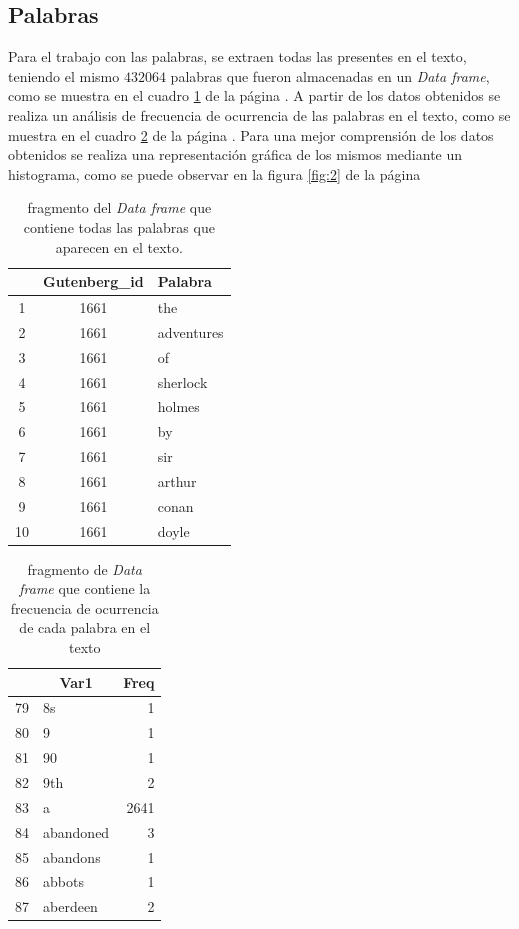 \documentclass{article}
\begin{document}
 \subsection{Palabras}
 Para el trabajo con las palabras, se extraen todas las presentes en el texto, teniendo el mismo $432064$ palabras que fueron almacenadas en un \textit{Data frame}, como se muestra en el cuadro \ref{tab:3} de la página \pageref{tab:3}. A partir de los datos obtenidos se realiza un análisis de frecuencia de ocurrencia de las palabras en el texto, como se muestra en el cuadro \ref{tab:4} de la página \pageref{tab:4}. Para una mejor comprensión de los datos obtenidos se realiza una representación gráfica de los mismos mediante un histograma, como se puede observar en la figura  \ref{fig:2} de la página \pageref{fig:2}
 
\begin{table}
  \centering
  \caption{fragmento del \textit{Data frame} que contiene todas las palabras que aparecen en el texto.}
    \begin{tabular}{ccl}
    \toprule
          & \textbf{Gutenberg\_id} & \textbf{Palabra} \\
    \midrule
    1     & 1661  & the \\
    2     & 1661  & adventures \\
    3     & 1661  & of \\
    4     & 1661  & sherlock \\
    5     & 1661  & holmes \\
    6     & 1661  & by \\
    7     & 1661  & sir \\
    8     & 1661  & arthur \\
    9     & 1661  & conan \\
    10    & 1661  & doyle \\
    \bottomrule
    \end{tabular}%
  \label{tab:3}%
\end{table}%
\begin{table}
  \centering
  \caption{fragmento de \textit{Data frame} que contiene la frecuencia de ocurrencia de cada palabra en el texto}
    \begin{tabular}{clr}
    \toprule
          & \multicolumn{1}{c}{\textbf{Var1}} & \multicolumn{1}{c}{\textbf{Freq}} \\
    \midrule
    79    & 8s    & 1 \\
    80    & 9     & 1 \\
    81    & 90    & 1 \\
    82    & 9th   & 2 \\
    83    & a     & 2641 \\
    84    & abandoned & 3 \\
    85    & abandons & 1 \\
    86    & abbots & 1 \\
    87    & aberdeen & 2 \\
    \bottomrule
    \end{tabular}%
  \label{tab:4}%
\end{table}%
\end{document}
